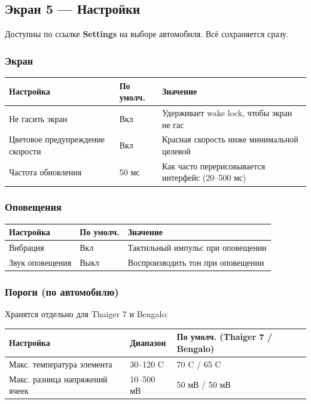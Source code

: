 \documentclass[11pt,a4paper,oneside]{report}
\newcommand{\degC}{\textdegree C}
\begin{document}
\subsection{Экран 5 --- Настройки}
Доступны по ссылке \textbf{Settings} на выборе автомобиля. Всё сохраняется сразу.

\subsubsection{Экран}

\begin{tabularx}{\linewidth}{@{}llL@{}}
\toprule
\textbf{Настройка} & \textbf{По умолч.} & \textbf{Значение}\\
\midrule
Не гасить экран & Вкл & Удерживает wake lock, чтобы экран не гас\\
Цветовое предупреждение скорости & Вкл & Красная скорость ниже минимальной целевой\\
Частота обновления & 50 мс & Как часто перерисовывается интерфейс (20--500 мс)\\
\bottomrule
\end{tabularx}

\subsubsection{Оповещения}

\begin{tabularx}{\linewidth}{@{}llL@{}}
\toprule
\textbf{Настройка} & \textbf{По умолч.} & \textbf{Значение}\\
\midrule
Вибрация & Вкл & Тактильный импульс при оповещении\\
Звук оповещения & Выкл & Воспроизводить тон при оповещении\\
\bottomrule
\end{tabularx}

\subsubsection{Пороги (по автомобилю)}
Хранятся отдельно для Thaiger 7 и Bengalo:

\begin{tabularx}{\linewidth}{@{}llL@{}}
\toprule
\textbf{Настройка} & \textbf{Диапазон} & \textbf{По умолч. (Thaiger 7 / Bengalo)}\\
\midrule
Макс. температура элемента & 30--120 \degC{} & 70 \degC{} / 65 \degC{}\\
Макс. разница напряжений ячеек & 10--500 мВ & 50 мВ / 50 мВ\\
\bottomrule
\end{tabularx}
\end{document}
